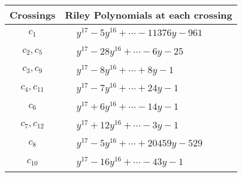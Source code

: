 \documentclass[1p]{elsarticle_modified}
\theoremstyle{definition}
\begin{document}
\begin{tabular}{m{50pt}|m{274pt}}
Crossings & \hspace{64pt}Riley Polynomials at each crossing \\
\hline $$\begin{aligned}c_{1}\end{aligned}$$&$\begin{aligned}
&y^{17}-5 y^{16}+\cdots-11376 y-961
\end{aligned}$\\
\hline $$\begin{aligned}c_{2},c_{5}\end{aligned}$$&$\begin{aligned}
&y^{17}-28 y^{16}+\cdots-6 y-25
\end{aligned}$\\
\hline $$\begin{aligned}c_{3},c_{9}\end{aligned}$$&$\begin{aligned}
&y^{17}-8 y^{16}+\cdots+8 y-1
\end{aligned}$\\
\hline $$\begin{aligned}c_{4},c_{11}\end{aligned}$$&$\begin{aligned}
&y^{17}-7 y^{16}+\cdots+24 y-1
\end{aligned}$\\
\hline $$\begin{aligned}c_{6}\end{aligned}$$&$\begin{aligned}
&y^{17}+6 y^{16}+\cdots-14 y-1
\end{aligned}$\\
\hline $$\begin{aligned}c_{7},c_{12}\end{aligned}$$&$\begin{aligned}
&y^{17}+12 y^{16}+\cdots-3 y-1
\end{aligned}$\\
\hline $$\begin{aligned}c_{8}\end{aligned}$$&$\begin{aligned}
&y^{17}-5 y^{16}+\cdots+20459 y-529
\end{aligned}$\\
\hline $$\begin{aligned}c_{10}\end{aligned}$$&$\begin{aligned}
&y^{17}-16 y^{16}+\cdots-43 y-1
\end{aligned}$\\
\hline
\end{tabular}\\~\\
\end{document}
